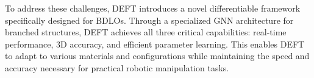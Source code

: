  To address these challenges, DEFT introduces a novel differentiable framework specifically designed for BDLOs. Through a specialized GNN architecture for branched structures, DEFT achieves all three critical capabilities: real-time performance, 3D accuracy, and efficient parameter learning. 
 This enables DEFT to adapt to various materials and configurations while maintaining the speed and accuracy necessary for practical robotic manipulation tasks.





